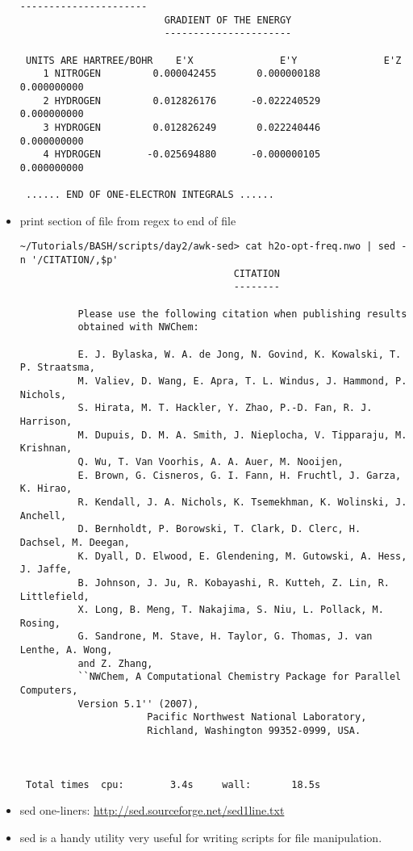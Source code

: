 \documentclass[10pt,t]{beamer}
\begin{document}
\begin{frame}
\begin{itemize}
\begin{lstlisting}[style=LINUX]
                         ----------------------
                         GRADIENT OF THE ENERGY
                         ----------------------

 UNITS ARE HARTREE/BOHR    E'X               E'Y               E'Z 
    1 NITROGEN         0.000042455       0.000000188       0.000000000
    2 HYDROGEN         0.012826176      -0.022240529       0.000000000
    3 HYDROGEN         0.012826249       0.022240446       0.000000000
    4 HYDROGEN        -0.025694880      -0.000000105       0.000000000
 
 ...... END OF ONE-ELECTRON INTEGRALS ......
      \end{lstlisting}
      \framebreak
    \item print section of file from regex to end of file
      \begin{lstlisting}[style=LINUX]
~/Tutorials/BASH/scripts/day2/awk-sed> cat h2o-opt-freq.nwo | sed -n '/CITATION/,$p'
                                     CITATION
                                     --------

          Please use the following citation when publishing results
          obtained with NWChem:

          E. J. Bylaska, W. A. de Jong, N. Govind, K. Kowalski, T. P. Straatsma,
          M. Valiev, D. Wang, E. Apra, T. L. Windus, J. Hammond, P. Nichols,
          S. Hirata, M. T. Hackler, Y. Zhao, P.-D. Fan, R. J. Harrison,
          M. Dupuis, D. M. A. Smith, J. Nieplocha, V. Tipparaju, M. Krishnan,
          Q. Wu, T. Van Voorhis, A. A. Auer, M. Nooijen,
          E. Brown, G. Cisneros, G. I. Fann, H. Fruchtl, J. Garza, K. Hirao,
          R. Kendall, J. A. Nichols, K. Tsemekhman, K. Wolinski, J. Anchell,
          D. Bernholdt, P. Borowski, T. Clark, D. Clerc, H. Dachsel, M. Deegan,
          K. Dyall, D. Elwood, E. Glendening, M. Gutowski, A. Hess, J. Jaffe,
          B. Johnson, J. Ju, R. Kobayashi, R. Kutteh, Z. Lin, R. Littlefield,
          X. Long, B. Meng, T. Nakajima, S. Niu, L. Pollack, M. Rosing,
          G. Sandrone, M. Stave, H. Taylor, G. Thomas, J. van Lenthe, A. Wong,
          and Z. Zhang,
          ``NWChem, A Computational Chemistry Package for Parallel Computers, 
          Version 5.1'' (2007),
                      Pacific Northwest National Laboratory,
                      Richland, Washington 99352-0999, USA.



 Total times  cpu:        3.4s     wall:       18.5s

      \end{lstlisting}
      \framebreak
    \item sed one-liners: \url{http://sed.sourceforge.net/sed1line.txt}
    \item sed is a handy utility very useful for writing scripts for file manipulation.
  \end{itemize}
\end{frame}
\end{document}
